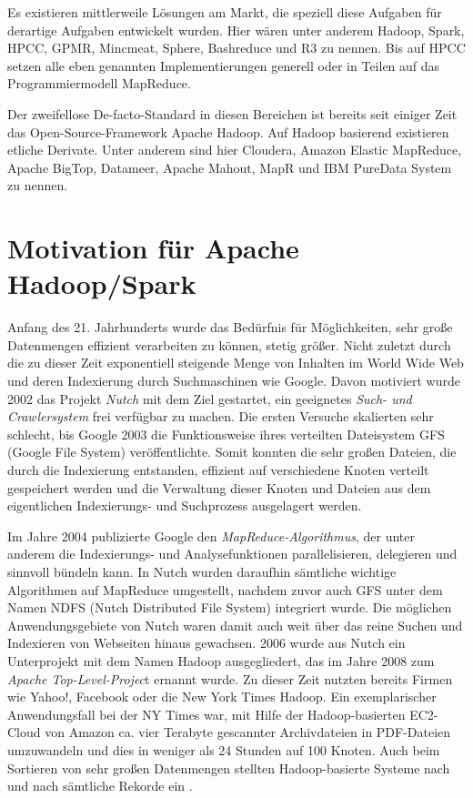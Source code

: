 Es existieren mittlerweile Lösungen am Markt, die speziell diese Aufgaben für derartige Aufgaben entwickelt wurden. Hier wären unter anderem Hadoop, Spark, HPCC, GPMR, Mincmeat, Sphere, Bashreduce und R3 zu nennen. Bis auf HPCC setzen alle eben genannten Implementierungen generell oder in Teilen auf das Programmiermodell MapReduce. 

Der zweifellose De-facto-Standard in diesen Bereichen ist bereits seit einiger Zeit das Open-Source-Framework Apache Hadoop. Auf Hadoop basierend existieren etliche Derivate. Unter anderem sind hier Cloudera, Amazon Elastic MapReduce, Apache BigTop, Datameer, Apache Mahout, MapR und IBM PureData System zu nennen. 



	





\section{Motivation für Apache Hadoop/Spark}
\label{section:motivation für Apache Hadoop/Spark}

Anfang des 21. Jahrhunderts wurde das Bedürfnis für Möglichkeiten, sehr große Datenmengen effizient verarbeiten zu können, stetig größer. Nicht zuletzt durch die zu dieser Zeit exponentiell steigende Menge von Inhalten im World Wide Web und deren Indexierung durch Suchmaschinen wie Google. Davon motiviert wurde 2002 das Projekt \textit{Nutch} mit dem Ziel gestartet, ein geeignetes \textit{Such- und Crawlersystem} frei verfügbar zu machen. Die ersten Versuche skalierten sehr schlecht, bis Google 2003 die Funktionsweise ihres verteilten Dateisystem GFS (Google File System) veröffentlichte. Somit konnten die sehr großen Dateien, die durch die Indexierung entstanden, effizient auf verschiedene Knoten verteilt gespeichert werden und die Verwaltung dieser Knoten und Dateien aus dem eigentlichen Indexierungs- und Suchprozess ausgelagert werden. 

Im Jahre 2004 publizierte Google den \textit{MapReduce-Algorithmus}, der unter anderem die Indexierungs- und Analysefunktionen parallelisieren, delegieren und sinnvoll bündeln kann. In Nutch wurden daraufhin sämtliche wichtige Algorithmen auf MapReduce umgestellt, nachdem zuvor auch GFS unter dem Namen NDFS (Nutch Distributed File System) integriert wurde. Die möglichen Anwendungsgebiete von Nutch waren damit auch weit über das reine Suchen und Indexieren von Webseiten hinaus gewachsen. 2006 wurde aus Nutch ein Unterprojekt mit dem Namen Hadoop ausgegliedert, das im Jahre 2008 zum \textit{Apache Top-Level-Projec}t ernannt wurde. Zu dieser Zeit nutzten bereits Firmen wie Yahoo!, Facebook oder die New York Times Hadoop. Ein exemplarischer Anwendungsfall bei der NY Times war, mit Hilfe der Hadoop-basierten EC2-Cloud von Amazon ca. vier Terabyte gescannter Archivdateien in PDF-Dateien umzuwandeln und dies in weniger als 24 Stunden auf 100 Knoten. Auch beim Sortieren von sehr großen Datenmengen stellten Hadoop-basierte Systeme nach und nach sämtliche Rekorde ein . 

